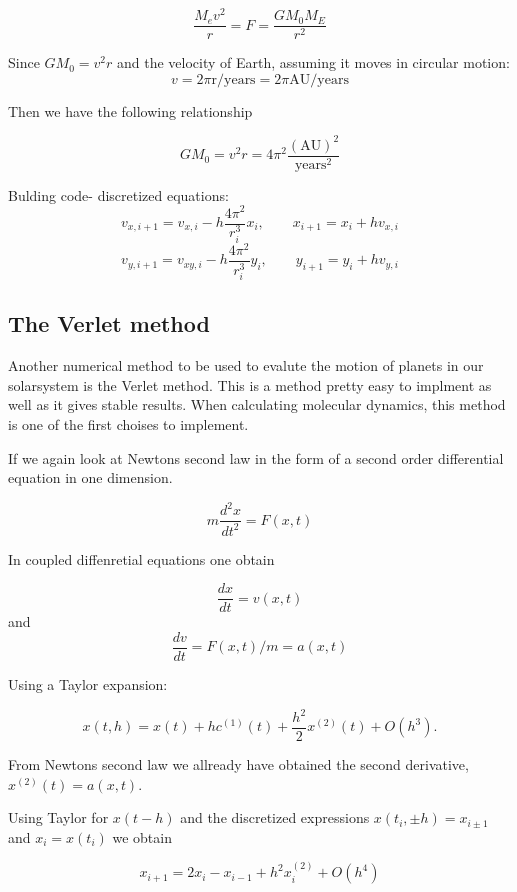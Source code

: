 \documentclass[../main.tex]{subfiles}
\begin{document}
\begin{equation}
  \frac{M_ev^2}{r} = F = \frac{GM_0M_E}{r^2}
\end{equation}

Since $GM_0 = v^2r$ and the velocity of Earth, assuming it moves in circular motion: $$v = 2\pi \text{r/years}= 2\pi \text{AU/years}$$

Then we have the following relationship

$$GM_0 = v^2r = 4\pi^2 \frac{(\text{AU})^2}{\text{years}^2}$$

Bulding code- discretized equations:
$$v_{x,i+1} = v_{x,i} - h \frac{4\pi^2}{r_i^3}x_i,\qquad x_{i+1} = x_{i} + hv_{x,i}$$
$$v_{y,i+1} = v_{xy,i} - h \frac{4\pi^2}{r_i^3}y_i,\qquad y_{i+1} = y_{i} + hv_{y,i}$$

\subsection{The Verlet method}
Another numerical method to be used to evalute the motion of planets in our solarsystem is the Verlet method. This is a method pretty easy to implment as well as it gives stable results. When calculating molecular dynamics, this method is one of the first choises to implement.

If we again look at Newtons second law in the form of a second order differential equation in one dimension.

\begin{equation}
 m \frac{d^2x}{dt^2} = F(x,t)
\end{equation}

In coupled diffenretial equations one obtain

$$\frac{dx}{dt} = v(x,t)$$    and     $$\frac{dv}{dt} = F(x,t)/m = a(x,t)$$

Using a Taylor expansion:

\begin{equation}
 x(t,h) = x(t) + hc^{(1)}(t) + \frac{h^2}{2}x^{(2)}(t) + O(h^3).
\end{equation}

From Newtons second law we allready have obtained the second derivative, $x^{(2)}(t) = a(x,t)$.

Using Taylor for $x(t-h)$ and the discretized expressions $x(t_i,\pm h) = x_{i \pm 1}$ and $x_i = x(t_i)$ we obtain

\begin{equation}
  x_{i+1} = 2x_i - x_{i-1} + h^2 x_i^{(2)} + O(h^4)
\end{equation}
\end{document}
